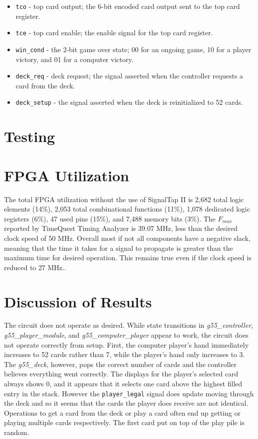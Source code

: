 \documentclass[12pt]{article}
\begin{document}
\begin{enumerate}
\begin{itemize}
\item \texttt{tco} - top card output; the 6-bit encoded card output sent to the top card register.
\item \texttt{tce} - top card enable; the enable signal for the top card register.
\item \texttt{win\_cond} - the 2-bit game over state; 00 for an ongoing game, 10 for a player victory, and 01 for a computer victory.
\item \texttt{deck\_req} - deck request; the signal asserted when the controller requests a card from the deck.
\item \texttt{deck\_setup} - the signal asserted when the deck is reinitialized to 52 cards.
\end{itemize}
\end{enumerate}

\section{Testing}

\section{FPGA Utilization}
The total FPGA utilization without the use of SignalTap II is 2,682 total logic elements (14\%), 2,053 total combinational functions (11\%), 1,078 dedicated logic registers (6\%), 47 used pins (15\%), and 7,488 memory bits (3\%). The $F_{max}$ reported by TimeQuest Timing Analyzer is 39.07 MHz, less than the desired clock speed of 50 MHz. Overall most if not all components have a negative slack, meaning that the time it takes for a signal to propagate is greater than the maximum time for desired operation. This remains true even if the clock speed is reduced to 27 MHz..

\section{Discussion of Results}
The circuit does not operate as desired. While state transitions in \textit{g55\_controller}, \textit{g55\_player\_module}, and \textit{g55\_computer\_player} appear to work, the circuit does not operate correctly from setup. First, the computer player's hand immediately increases to 52 cards rather than 7, while the player's hand only increases to 3. The \textit{g55\_deck}, however, pops the correct number of cards and the controller believes everything went correctly. The displays for the player's selected card always shows 0, and it appears that it selects one card above the highest filled entry in the stack. However the \texttt{player\_legal} signal does update moving through the deck and so it seems that the cards the player does receive are not identical. Operations to get a card from the deck or play a card often end up getting or playing multiple cards respectively. The first card put on top of the play pile is random. \\
\end{document}
